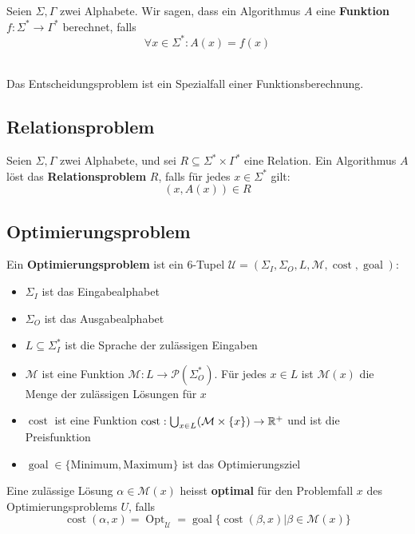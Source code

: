 \begin{definition}
Seien $\Sigma, \Gamma$ zwei Alphabete. Wir sagen, dass ein Algorithmus $A$ eine \textbf{Funktion $f: \Sigma^* \to \Gamma^*$} berechnet, falls
\[
\forall x \in \Sigma^*: A(x) = f(x)
\]\\
\end{definition}

Das Entscheidungsproblem ist ein Spezialfall einer Funktionsberechnung.

\subsection{Relationsproblem}
\begin{definition}
Seien $\Sigma, \Gamma$ zwei Alphabete, und sei $R \subseteq \Sigma^* \times \Gamma^*$ eine Relation. Ein Algorithmus $A$ löst das \textbf{Relationsproblem} $R$, falls für jedes $x \in \Sigma^*$ gilt:
\[
(x, A(x)) \in R
\]
\end{definition}

\subsection{Optimierungsproblem}
\begin{definition}
Ein \textbf{Optimierungsproblem} ist ein 6-Tupel $\mathcal{U} = (\Sigma_I, \Sigma_O, L, \mathcal{M}, \operatorname{cost}, \operatorname{goal})$:
\begin{itemize}
  \item $\Sigma_I$ ist das Eingabealphabet
  \item $\Sigma_O$ ist das Ausgabealphabet
  \item $L \subseteq \Sigma_I^*$ ist die Sprache der zulässigen Eingaben
  \item $\mathcal{M}$ ist eine Funktion $\mathcal{M}: L \to \mathcal{P}(\Sigma_O^*)$. Für jedes $x \in L$ ist $\mathcal{M}(x)$ die Menge der zulässigen Lösungen für $x$
  \item $\operatorname{cost}$ ist eine Funktion $\operatorname{cost}: \bigcup_{x \in L}(\mathcal{M} \times \{x\}) \to \mathbb{R}^+$ und ist die Preisfunktion
  \item $\operatorname{goal} \in \{\text{Minimum}, \text{Maximum}\}$ ist das Optimierungsziel
\end{itemize}

Eine zulässige Lösung $\alpha \in \mathcal{M}(x)$ heisst \textbf{optimal} für den Problemfall $x$ des Optimierungsproblems $U$, falls
\[
\operatorname{cost}(\alpha, x) = \operatorname{Opt}_\mathcal{U} = \operatorname{goal}\{\operatorname{cost}(\beta, x) | \beta \in \mathcal{M}(x)\}
\]\\
\end{definition}


